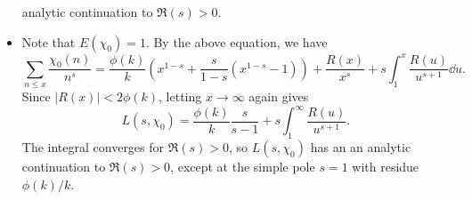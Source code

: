 \begin{pf}
\begin{itemize}
        analytic continuation to $\Re(s) > 0$. 
        \item Note that $E(\chi_0) = 1$. By the above equation, we have 
        \[ \sum_{n\leq x} \frac{\chi_0(n)}{n^s} = \frac{\phi(k)}{k} \left( x^{1-s} + 
        \frac{s}{1-s} (x^{1-s} - 1) \right) + \frac{R(x)}{x^s} + s \int_1^x 
        \frac{R(u)}{u^{s+1}}\dd u. \]
        Since $|R(x)| < 2\phi(k)$, letting $x \to \infty$ again gives 
        \[ L(s, \chi_0) = \frac{\phi(k)}{k} \frac{s}{s-1} + s \int_1^\infty 
        \frac{R(u)}{u^{s+1}}. \] 
        The integral converges for $\Re(s) > 0$, so $L(s, \chi_0)$ has an an analytic 
        continuation to $\Re(s) > 0$, except at the simple pole $s = 1$ with 
        residue $\phi(k)/k$. \qedhere 
    \end{itemize}
\end{pf}